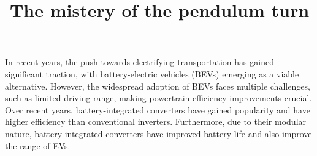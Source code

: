 \documentclass[a4paper]{article}
\title{The mistery of the pendulum turn}
\begin{document}
\maketitle

In recent years, the push towards electrifying transportation has gained significant traction, with battery-electric vehicles (BEVs) emerging as a viable alternative. However, the widespread adoption of BEVs faces multiple challenges, such as limited driving range, making powertrain efficiency improvements crucial. Over recent years, battery-integrated converters have gained popularity and have higher efficiency than conventional inverters. Furthermore, due to their modular nature, battery-integrated converters have improved battery life and also improve the range of EVs. 
\end{document}
